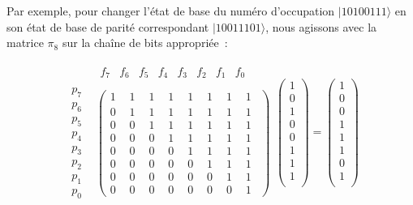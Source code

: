 \documentclass[12pt,a4paper]{article} %
\numberwithin{equation}{section} %
\numberwithin{figure}{section} %
\numberwithin{table}{section} %
\begin{document}
Par exemple, pour changer l'état de base du numéro d'occupation $|1 0 1 0 0 1 1 1\rangle$ en son état de base de parité correspondant $|1 0 0 1 1 1 0 1\rangle$, nous agissons avec la matrice $\pi_8$ sur la chaîne de bits appropriée :

$$
\begin{matrix}
& \begin{matrix}f_7 & f_6 & f_5 & f_4 & f_3 & f_2 & f_1 & f_0 \end{matrix} \\
\begin{matrix}p_7\\p_6\\p_5\\p_4\\p_3\\p_2\\p_1\\p_0\end{matrix}&
\begin{pmatrix} 1_{\phantom{7}} & 1_{\phantom{6}} & 1_{\phantom{5}} & 1_{\phantom{4}} & 1_{\phantom{3}} & 1_{\phantom{2}} & 1_{\phantom{1}} & 1_{\phantom{0}} \\
               0 & 1 & 1 & 1 & 1 & 1 & 1 & 1 \\
               0 & 0 & 1 & 1 & 1 & 1 & 1 & 1 \\
               0 & 0 & 0 & 1 & 1 & 1 & 1 & 1 \\
               0 & 0 & 0 & 0 & 1 & 1 & 1 & 1 \\
               0 & 0 & 0 & 0 & 0 & 1 & 1 & 1 \\
               0 & 0 & 0 & 0 & 0 & 0 & 1 & 1 \\
               0 & 0 & 0 & 0 & 0 & 0 & 0 & 1 
 \end{pmatrix}
\end{matrix}
\begin{pmatrix}
  1 \\
  0 \\
  1 \\
  0 \\
  0 \\
  1 \\
  1 \\
  1\\
 \end{pmatrix}
 =
 \begin{pmatrix}
  1 \\
  0 \\
  0 \\
  1 \\
  1 \\
  1 \\
  0 \\
  1\\
 \end{pmatrix}
$$
\end{document}
